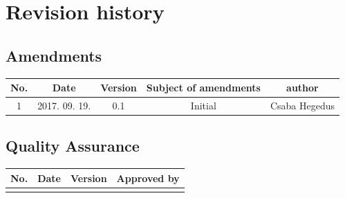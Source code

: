\documentclass[a4paper]{arrowhead}
\begin{document}
\section[Revision history]{Revision history}
\subsection[Amendments]{Amendments}

\begin{tabular}{|c|c|c|c|c|}
	\hline 
	No. & Date & Version & Subject of amendments & author \\ 
	\hline 
	1 & 2017. 09. 19. & 0.1 & Initial & Csaba Hegedus \\ 
	\hline 
\end{tabular} 

\subsection[Quality Assurance]{Quality Assurance}
\begin{tabular}{|c|c|c|c|}
	\hline 
	No. & Date & Version & Approved by \\ 
	\hline 
	&  &  &  \\ 
	\hline 
\end{tabular} 
\end{document}
